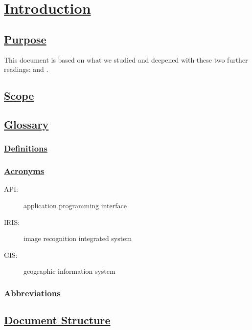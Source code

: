 \section[Introduction]{\hyperlink{toc}{Introduction}}
\subsection[Purpose]{\hyperlink{toc}{Purpose}}
This document is based on what we studied and deepened with these two further readings: \cite{IEEErasd} and \cite{IEEEre}.

\subsection[Scope]{\hyperlink{toc}{Scope}}

\subsection[Glossary]{\hyperlink{toc}{Glossary}}
	\subsubsection[Definitions]{\hyperlink{toc}{Definitions}}
	\subsubsection[Acronyms]{\hyperlink{toc}{Acronyms}}
		\begin{description}
			\item[API:] application programming interface
			\item[IRIS:] image recognition integrated system
			\item[GIS:] geographic information system
		\end{description}
	\subsubsection[Abbreviations]{\hyperlink{toc}{Abbreviations}}
	
		
\subsection[Document Structure]{\hyperlink{toc}{Document Structure}}	

